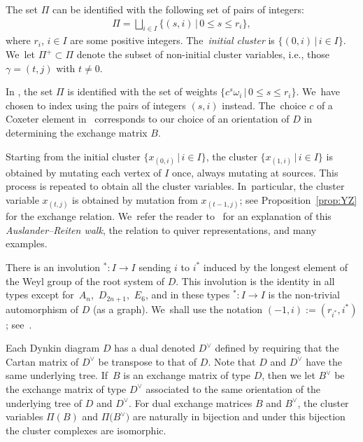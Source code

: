 \documentclass[pdftex]{sigma}%
\numberwithin{equation}{section}
\begin{document}
The set $\Pi$ can be identified with the following set of pairs of integers:
\begin{gather}\label{eq:Pidef}
\Pi = \bigsqcup_{i \in I} \{(s,i) \,|\, 0 \leq s \leq r_i\},
\end{gather}
where $r_i$, $i \in I$ are some positive integers. The~\emph{initial cluster} is $\{(0,i) \,|\, i \in I\}$. We~let $\Pi^+ \subset \Pi$ denote the subset of non-initial cluster variables, i.e., those $\gamma = (t,j)$ with $t \neq 0$.

\begin{Remark}
In \cite{YZ}, the set $\Pi$ is identified with the set of weights $\{c^s \omega_i \,|\, 0 \leq s \leq r_i\}$. We~have chosen to index using the pairs of integers $(s,i)$ instead. The~choice $c$ of a Coxeter element in~\cite{YZ} corresponds to our choice of an orientation of $D$ in determining the exchange matrix $B$.
\end{Remark}

\begin{Remark}
Starting from the initial cluster $\{x_{(0,i)} \,|\, i \in I\}$, the cluster $\{x_{(1,i)} \,|\, i \in I\}$ is obtained by mutating each vertex of $I$ once, always mutating at sources. This process is repeated to obtain all the cluster variables. In~particular, the cluster variable $x_{(t,j)}$ is obtained by mutation from $x_{(t-1,j)}$; see Proposition~\ref{prop:YZ} for the exchange relation. We~refer the reader to~\cite{BDMTY} for an explanation of this \emph{Auslander--Reiten walk}, the relation to quiver representations, and many examples.
\end{Remark}

\bigskip{}
There is an involution ${}^*\colon I \to I$ sending $i$ to $i^*$ induced by the longest element of the Weyl group of the root system of $D$. This involution is the identity in all types except for~$A_n$,~$D_{2n+1}$,~$E_6$, and in these types ${}^*\colon I \to I$ is the non-trivial automorphism of $D$ (as a graph). We~shall use the notation $(-1,i):= (r_{i^*}, i^*)$; see~\cite[Proposition~1.3]{YZ}.

\bigskip{} %
Each Dynkin diagram $D$ has a dual denoted $D^\vee$ defined by requiring that the Cartan matrix of $D^\vee$ be transpose to that of $D$. Note that $D$ and $D^\vee$ have the same underlying tree. If~$B$ is an exchange matrix of type $D$, then we let $B^\vee$ be the exchange matrix of type $D^\vee$ associated to the same orientation of the underlying tree of $D$ and $D^\vee$.
For dual exchange matrices $B$ and $B^\vee$, the cluster variables $\Pi(B)$ and $\Pi\big(B^\vee\big)$ are naturally in bijection and under this bijection the cluster complexes are isomorphic.
\end{document}
